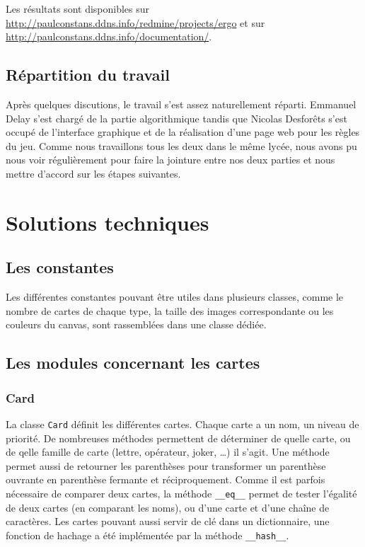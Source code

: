 \documentclass[12pt, algo]{cours}
\begin{document}
Les résultats sont disponibles sur \url{http://paulconstans.ddns.info/redmine/projects/ergo} et sur \url{http://paulconstans.ddns.info/documentation/}.

\subsection{Répartition du travail}

Après quelques discutions, le travail s'est assez naturellement réparti. Emmanuel Delay s'est chargé de la partie algorithmique tandis que Nicolas Desforêts s'est occupé de l'interface graphique et de la réalisation d'une page web pour les règles du jeu. Comme nous travaillons tous les deux dans le même lycée, nous avons pu nous voir régulièrement pour faire la jointure entre nos deux parties et nous mettre d'accord sur les étapes suivantes.

\section{Solutions techniques}

\subsection{Les constantes}

Les différentes constantes pouvant être utiles dans plusieurs classes, comme le nombre de cartes de chaque type, la taille des images correspondante ou les couleurs du canvas, sont rassemblées dans une classe dédiée.

\subsection{Les modules concernant les cartes}


\subsubsection{Card}

La classe \texttt{Card} définit les différentes cartes. Chaque carte a un nom, un niveau de priorité. De nombreuses méthodes permettent de déterminer de quelle carte, ou de qelle famille de carte (lettre, opérateur, joker, \dots) il s'agit. Une méthode permet aussi de \og retourner \fg les parenthèses pour transformer un parenthèse ouvrante en parenthèse fermante et réciproquement. Comme il est parfois nécessaire de comparer deux cartes, la méthode \texttt{\_\_eq\_\_} permet de tester l'égalité de deux cartes (en comparant les noms), ou d'une carte et d'une chaîne de caractères. Les cartes pouvant aussi servir de clé dans un dictionnaire, une fonction de hachage a été implémentée par la méthode \texttt{\_\_hash\_\_}.
\end{document}

